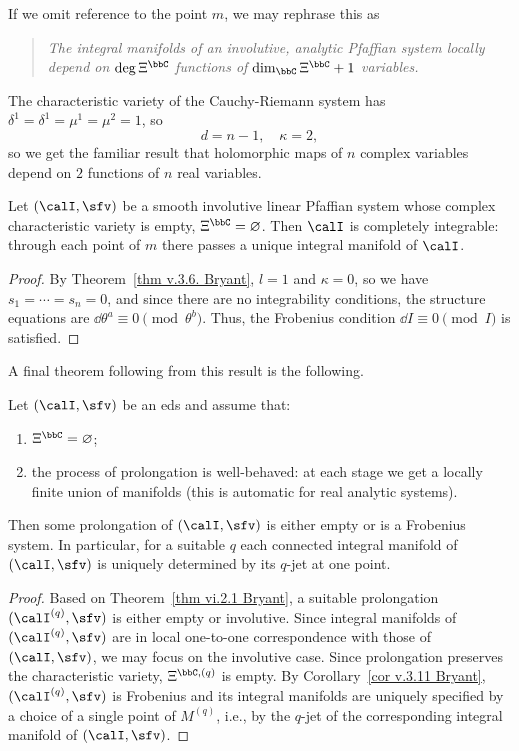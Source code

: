 If we omit reference to the point $m$, we may rephrase this as 
\begin{quote}
    \emph{The integral manifolds of an involutive, analytic Pfaffian system locally depend on $\deg\Xi^\bbC$ functions of $\dim_\bbC\Xi^\bbC+1$ variables.}
\end{quote}

\begin{example}
    The characteristic variety of the Cauchy-Riemann system has $\delta^1=\delta^1=\mu^1=\mu^2=1$, so 
    \[d=n-1,\quad \kappa=2,\]
    so we get the familiar result that holomorphic maps of $n$ complex variables depend on $2$ functions of $n$ real variables.
\end{example}

\begin{cor}\label{cor v.3.11 Bryant}
    Let $(\calI,\sfv)$ be a smooth involutive linear Pfaffian system whose complex characteristic variety is empty, $\Xi^\bbC=\varnothing$. Then $\calI$ is completely integrable: through each point of $m$ there passes a unique integral manifold of $\calI$.
\end{cor}
\begin{proof}
    By Theorem~\ref{thm v.3.6. Bryant}, $l=1$ and $\kappa=0$, so we have $s_1=\cdots=s_n=0$, and since there are no integrability conditions, the structure equations are $\dd\theta^a\equiv 0\pmod{\theta^b}$. Thus, the Frobenius condition $\dd I\equiv 0\pmod{I}$ is satisfied.
\end{proof}

A final theorem following from this result is the following.

\begin{thm}
    Let $(\calI,\sfv)$ be an \gls{eds} and assume that:
    \begin{enumerate}[label=(\roman*)]
        \item $\Xi^\bbC=\varnothing$;
        \item the process of prolongation is well-behaved: at each stage we get a locally finite union of manifolds (this is automatic for real analytic systems).
    \end{enumerate}
    Then some prolongation of $(\calI,\sfv)$ is either empty or is a Frobenius system. In particular, for a suitable $q$ each connected integral manifold of $(\calI,\sfv)$ is uniquely determined by its $q$-jet at one point.
\end{thm}
\begin{proof}
    Based on Theorem~\ref{thm vi.2.1 Bryant}, a suitable prolongation $(\calI^{(q)},\sfv)$ is either empty or involutive. Since integral manifolds of $(\calI^{(q)},\sfv)$ are in local one-to-one correspondence with those of $(\calI,\sfv)$, we may focus on the involutive case.  Since prolongation preserves the characteristic variety, $\Xi^{\bbC,(q)}$ is empty. By Corollary~\ref{cor v.3.11 Bryant}, $(\calI^{(q)},\sfv)$ is Frobenius and its integral manifolds are uniquely specified by a choice of a single point of $M^{(q)}$, i.e., by the $q$-jet of the corresponding integral manifold of $(\calI,\sfv)$.
\end{proof}

